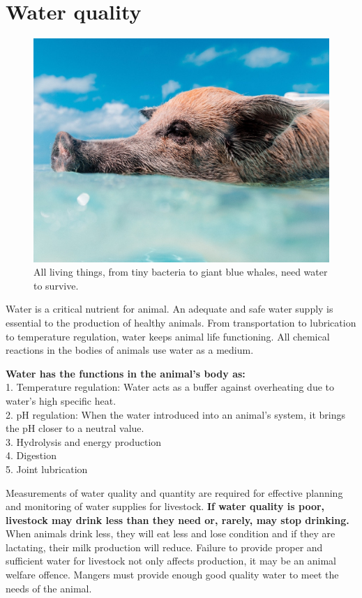 \documentclass[]{book}
\begin{document}
\chapter{Water quality}\label{water-quality}

\begin{figure}

{\centering \includegraphics[width=1\linewidth,height=1\textheight]{figures/water-pig} 

}

\caption{All living things, from tiny bacteria to giant blue whales, need water to survive.}\label{fig:water-pig}
\end{figure}

Water is a critical nutrient for animal. An adequate and safe water
supply is essential to the production of healthy animals. From
transportation to lubrication to temperature regulation, water keeps
animal life functioning. All chemical reactions in the bodies of animals
use water as a medium.

\textbf{Water has the functions in the animal's body as:}\\
1. Temperature regulation: Water acts as a buffer against overheating
due to water's high specific heat.\\
2. pH regulation: When the water introduced into an animal's system, it
brings the pH closer to a neutral value.\\
3. Hydrolysis and energy production\\
4. Digestion\\
5. Joint lubrication

Measurements of water quality and quantity are required for effective
planning and monitoring of water supplies for livestock. \textbf{If
water quality is poor, livestock may drink less than they need or,
rarely, may stop drinking.} When animals drink less, they will eat less
and lose condition and if they are lactating, their milk production will
reduce. Failure to provide proper and sufficient water for livestock not
only affects production, it may be an animal welfare offence. Mangers
must provide enough good quality water to meet the needs of the animal.
\end{document}
